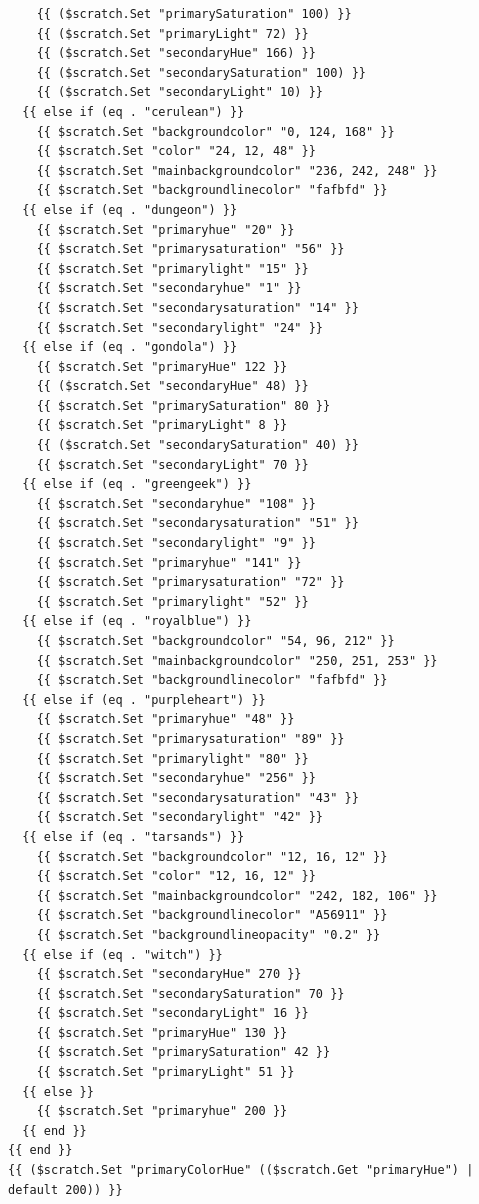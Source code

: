 \documentclass[11pt]{article}
\begin{document}
\begin{enumerate}
\begin{verbatim}
    {{ ($scratch.Set "primarySaturation" 100) }}
    {{ ($scratch.Set "primaryLight" 72) }}
    {{ ($scratch.Set "secondaryHue" 166) }}
    {{ ($scratch.Set "secondarySaturation" 100) }}
    {{ ($scratch.Set "secondaryLight" 10) }}
  {{ else if (eq . "cerulean") }}
    {{ $scratch.Set "backgroundcolor" "0, 124, 168" }}
    {{ $scratch.Set "color" "24, 12, 48" }}
    {{ $scratch.Set "mainbackgroundcolor" "236, 242, 248" }}
    {{ $scratch.Set "backgroundlinecolor" "fafbfd" }}
  {{ else if (eq . "dungeon") }}
    {{ $scratch.Set "primaryhue" "20" }}
    {{ $scratch.Set "primarysaturation" "56" }}
    {{ $scratch.Set "primarylight" "15" }}
    {{ $scratch.Set "secondaryhue" "1" }}
    {{ $scratch.Set "secondarysaturation" "14" }}
    {{ $scratch.Set "secondarylight" "24" }}
  {{ else if (eq . "gondola") }}
    {{ $scratch.Set "primaryHue" 122 }}
    {{ ($scratch.Set "secondaryHue" 48) }}
    {{ $scratch.Set "primarySaturation" 80 }}
    {{ $scratch.Set "primaryLight" 8 }}
    {{ ($scratch.Set "secondarySaturation" 40) }}
    {{ $scratch.Set "secondaryLight" 70 }}
  {{ else if (eq . "greengeek") }}
    {{ $scratch.Set "secondaryhue" "108" }}
    {{ $scratch.Set "secondarysaturation" "51" }}
    {{ $scratch.Set "secondarylight" "9" }}
    {{ $scratch.Set "primaryhue" "141" }}
    {{ $scratch.Set "primarysaturation" "72" }}
    {{ $scratch.Set "primarylight" "52" }}
  {{ else if (eq . "royalblue") }}
    {{ $scratch.Set "backgroundcolor" "54, 96, 212" }}
    {{ $scratch.Set "mainbackgroundcolor" "250, 251, 253" }}
    {{ $scratch.Set "backgroundlinecolor" "fafbfd" }}
  {{ else if (eq . "purpleheart") }}
    {{ $scratch.Set "primaryhue" "48" }}
    {{ $scratch.Set "primarysaturation" "89" }}
    {{ $scratch.Set "primarylight" "80" }}
    {{ $scratch.Set "secondaryhue" "256" }}
    {{ $scratch.Set "secondarysaturation" "43" }}
    {{ $scratch.Set "secondarylight" "42" }}
  {{ else if (eq . "tarsands") }}
    {{ $scratch.Set "backgroundcolor" "12, 16, 12" }}
    {{ $scratch.Set "color" "12, 16, 12" }}
    {{ $scratch.Set "mainbackgroundcolor" "242, 182, 106" }}
    {{ $scratch.Set "backgroundlinecolor" "A56911" }}
    {{ $scratch.Set "backgroundlineopacity" "0.2" }}
  {{ else if (eq . "witch") }}
    {{ $scratch.Set "secondaryHue" 270 }}
    {{ $scratch.Set "secondarySaturation" 70 }}
    {{ $scratch.Set "secondaryLight" 16 }}
    {{ $scratch.Set "primaryHue" 130 }}
    {{ $scratch.Set "primarySaturation" 42 }}
    {{ $scratch.Set "primaryLight" 51 }}
  {{ else }}
    {{ $scratch.Set "primaryhue" 200 }}
  {{ end }}
{{ end }}
{{ ($scratch.Set "primaryColorHue" (($scratch.Get "primaryHue") | default 200)) }}

\end{verbatim}
\end{enumerate}
\end{document}
